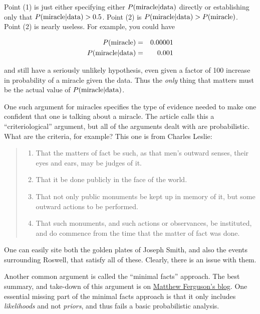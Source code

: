 Point (1) is just either specifying either
\(P({\rm miracle}|{\rm data})\) directly or establishing only that
\(P({\rm miracle}|{\rm data})>0.5\). Point (2) is
\(P({\rm miracle}|{\rm data})>P({\rm miracle})\). Point (2) is nearly
useless. For example, you could have

\begin{eqnarray*}
P({\rm miracle})&=&0.00001 \\
P({\rm miracle}|{\rm data})&=&0.001
\end{eqnarray*}

and still have a seriously unlikely hypothesis, even given a factor of
100 increase in probability of a miracle given the data. Thus the
\emph{only} thing that matters must be the actual value of
\(P({\rm miracle}|{\rm data})\).

One such argument for miracles specifies the type of evidence needed to
make one confident that one is talking about a miracle. The article
calls this a ``criteriological'' argument, but all of the arguments
dealt with are probabilistic. What are the criteria, for example? This
one is from Charles Leslie:

\begin{quote}
\begin{enumerate}
\def\labelenumi{\arabic{enumi}.}
\itemsep1pt\parskip0pt
\item
  That the matters of fact be such, as that men's outward senses, their
  eyes and ears, may be judges of it.
\item
  That it be done publicly in the face of the world.
\item
  That not only public monuments be kept up in memory of it, but some
  outward actions to be performed.
\item
  That such monuments, and such actions or observances, be instituted,
  and do commence from the time that the matter of fact was done.
\end{enumerate}
\end{quote}

One can easily site both the golden plates of Joseph Smith, and also the
events surrounding Roswell, that satisfy all of these. Clearly, there is
an issue with them.

Another common argument is called the ``minimal facts'' approach. The
best summary, and take-down of this argument is on
\href{https://adversusapologetica.wordpress.com/2013/06/29/knocking-out-the-pillars-of-the-minimal-facts-apologetic/}{Matthew
Ferguson's blog}. One essential missing part of the minimal facts
approach is that it only includes \emph{likelihoods} and not
\emph{priors}, and thus fails a basic probabilistic analysis.

